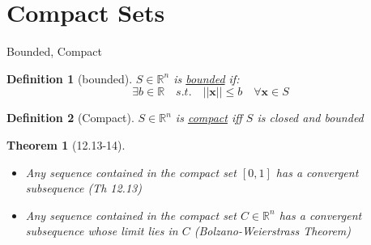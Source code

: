 \documentclass[final]{beamer}
\newtheorem{defn}{Definition}
\newtheorem{thm}{Theorem}
\begin{document}
\section{Compact Sets} %
\label{sec:compact_sets}
\begin{frame}[t]{Bounded, Compact}
	\begin{defn}
		[bounded] $S\in\mathbb{R}^n$ is \uline{bounded} if:\[
			\exists b\in \mathbb{R}\quad s.t.\quad ||\mathbf{x}||\le b\quad \forall \mathbf{x}\in S
		\]
	\end{defn}
	\begin{defn}
		[Compact] $S\in\mathbb{R}^n $ is \uline{compact} iff $S$ is closed and bounded
	\end{defn}
	\begin{thm}[12.13-14]
		\begin{itemize}
			\item Any sequence contained in the compact set $[0,1]$ has a convergent subsequence (Th 12.13)
			\item Any sequence contained in the compact set $C\in\mathbb{R}^n$ has a convergent subsequence whose limit lies in $C$ (Bolzano-Weierstrass Theorem)
		\end{itemize}
	\end{thm}
\end{frame}
\end{document}
